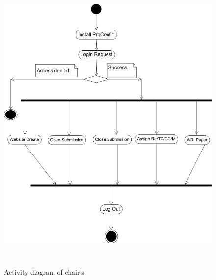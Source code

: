 \begin{figure}[h!]
\centering
  \includegraphics[width=6in,height=6in]{pic/acc}
  \caption{Activity diagram of chair’s}\label{activityc}
\end{figure}
\newpage

